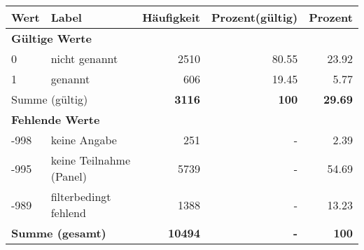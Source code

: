      \begin{longtable}{lXrrr}
     \toprule
     \textbf{Wert} & \textbf{Label} & \textbf{Häufigkeit} & \textbf{Prozent(gültig)} & \textbf{Prozent} \\
     \endhead
     \midrule
     \multicolumn{5}{l}{\textbf{Gültige Werte}}\\

     0 &
     \multicolumn{1}{X}{ nicht genannt   } &


       \num{2510} &
       \num[round-mode=places,round-precision=2]{80,55} &
         \num[round-mode=places,round-precision=2]{23,92} \\

     1 &
     \multicolumn{1}{X}{ genannt   } &


       \num{606} &
       \num[round-mode=places,round-precision=2]{19,45} &
         \num[round-mode=places,round-precision=2]{5,77} \\
     \midrule
     \multicolumn{2}{l}{Summe (gültig)} &
       \textbf{\num{3116}} &
     \textbf{100} &
       \textbf{\num[round-mode=places,round-precision=2]{29,69}} \\
     \multicolumn{5}{l}{\textbf{Fehlende Werte}}\\
       -998 &
       keine Angabe &
         \num{251} &
        - &
         \num[round-mode=places,round-precision=2]{2,39} \\
       -995 &
       keine Teilnahme (Panel) &
         \num{5739} &
        - &
         \num[round-mode=places,round-precision=2]{54,69} \\
       -989 &
       filterbedingt fehlend &
         \num{1388} &
        - &
         \num[round-mode=places,round-precision=2]{13,23} \\
     \midrule
     \multicolumn{2}{l}{\textbf{Summe (gesamt)}} &
          \textbf{\num{10494}} &
        \textbf{-} &
        \textbf{100} \\
     \bottomrule
     \end{longtable}
     
